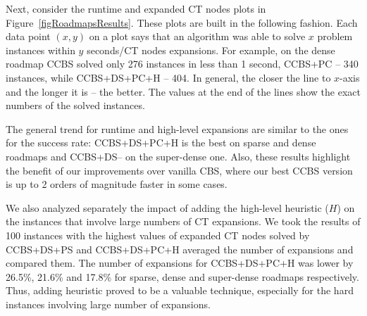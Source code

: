 \documentclass[letterpaper]{article} %
\newcommand\konstantin[1]{\nb{\textbf{Konstantin:}}{red}{#1}}
\newcommand\roni[1]{\nb{\textbf{Roni:}}{orange}{#1}}
\newcommand{\cbs}{\ac{CBS}\xspace}
\newcommand{\ccbs}{\ac{CCBS}\xspace}
\newcommand{\ct}{\ac{CT}\xspace}
\newcommand{\pc}{\ac{PC}\xspace}
\newcommand{\ds}{\ac{DS}\xspace}
\begin{document}

Next, consider the runtime and expanded \ct nodes plots in Figure~\ref{figRoadmapsResults}.
These plots are built in the following fashion.
Each data point $(x,y)$ on a plot says that an algorithm was able to solve $x$ problem instances within $y$ seconds/\ct nodes expansions.
For example, on the dense roadmap \ccbs solved only 276 instances in less than 1 second, \ccbs+PC -- 340 instances, while \ccbs+\ds+\pc+H -- 404. In general, the closer the line to $x$-axis and the longer it is -- the better. The values at the end of the lines show the exact numbers of the solved instances.

The general trend for runtime and high-level expansions are similar to the ones for the success rate:
\ccbs+\ds+\pc+H is the best on sparse and dense roadmaps and \ccbs+\ds -- on the super-dense one. Also, these results highlight the benefit of our improvements over vanilla \cbs, where our best \ccbs version is up to 2 orders of magnitude faster in some cases.



We also analyzed separately the impact of adding the high-level heuristic ($H$) on the instances that involve large numbers of \ct expansions. We took the results of 100 instances with the highest values of expanded \ct nodes solved by \ccbs+DS+PS and \ccbs+DS+PC+H averaged the number of expansions and compared them. The number of expansions for \ccbs+DS+PC+H was lower by 26.5\%, 21.6\% and 17.8\% for sparse, dense and super-dense roadmaps respectively. Thus, adding heuristic proved to be a valuable technique, especially for the hard instances involving large number of expansions.
\end{document}
